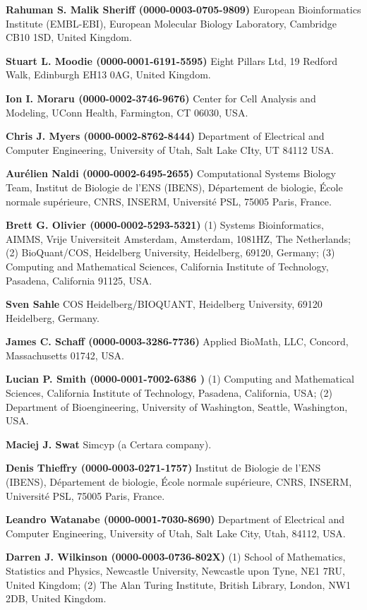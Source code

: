 \documentclass{sbml-paper}
\begin{document}
\textbf{Rahuman S. Malik Sheriff (0000-0003-0705-9809)} European Bioinformatics Institute (EMBL-EBI), European Molecular Biology Laboratory, Cambridge CB10 1SD, United Kingdom.

\textbf{Stuart L. Moodie (0000-0001-6191-5595)} Eight Pillars Ltd, 19 Redford Walk, Edinburgh EH13 0AG, United Kingdom.

\textbf{Ion I. Moraru (0000-0002-3746-9676)} Center for Cell Analysis and Modeling, UConn Health, Farmington, CT 06030, USA.

\textbf{Chris J. Myers (0000-0002-8762-8444)} Department of Electrical and Computer Engineering, University of Utah, Salt Lake CIty, UT 84112 USA.

\textbf{Aurélien Naldi (0000-0002-6495-2655)} Computational Systems Biology Team, Institut de Biologie de l’ENS (IBENS), Département de biologie, École normale supérieure, CNRS, INSERM, Université PSL, 75005 Paris, France.

\textbf{Brett G. Olivier (0000-0002-5293-5321)} (1) Systems Bioinformatics, AIMMS, Vrije Universiteit Amsterdam, Amsterdam, 1081HZ, The Netherlands; (2) BioQuant/COS, Heidelberg University, Heidelberg, 69120, Germany; (3) Computing and Mathematical Sciences, California Institute of Technology, Pasadena, California 91125, USA.

\textbf{Sven Sahle} COS Heidelberg/BIOQUANT,  Heidelberg University, 69120 Heidelberg, Germany.

\textbf{James C. Schaff (0000-0003-3286-7736)} Applied BioMath, LLC, Concord, Massachusetts 01742, USA.

\textbf{Lucian P. Smith (0000-0001-7002-6386 )} (1) Computing and Mathematical Sciences, California Institute of Technology, Pasadena, California, USA; (2) Department of Bioengineering, University of Washington, Seattle, Washington, USA.

\textbf{Maciej J. Swat} Simcyp (a Certara company).

\textbf{Denis Thieffry (0000-0003-0271-1757)} Institut de Biologie de l'ENS (IBENS), Département de biologie, École normale supérieure, CNRS, INSERM, Université PSL, 75005 Paris, France.

\textbf{Leandro Watanabe (0000-0001-7030-8690)} Department of Electrical and Computer Engineering,  University of Utah, Salt Lake City, Utah, 84112, USA.

\textbf{Darren J. Wilkinson (0000-0003-0736-802X)} (1) School of Mathematics, Statistics and Physics, Newcastle University, Newcastle upon Tyne, NE1 7RU, United Kingdom; (2) The Alan Turing Institute, British Library, London, NW1 2DB, United Kingdom.
\end{document}
